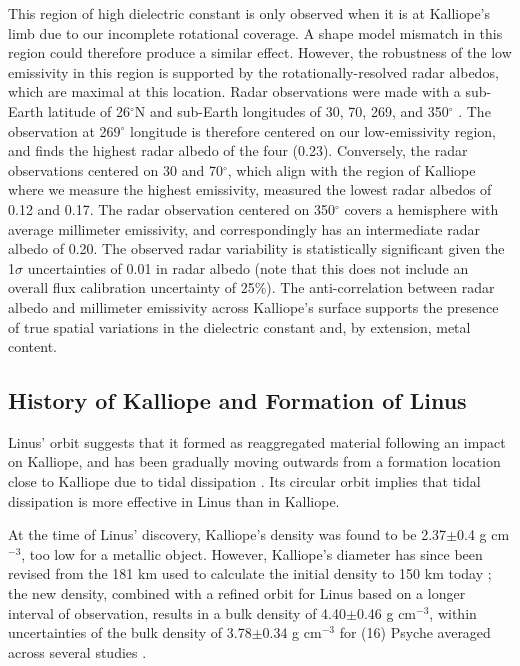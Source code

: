 \documentclass[]{aastex631}
\begin{document}
This region of high dielectric constant is only observed when it is at Kalliope's limb due to our incomplete rotational coverage. A shape model mismatch in this region could therefore produce a similar effect. However, the robustness of the low emissivity in this region is supported by the rotationally-resolved radar albedos, which are maximal at this location. Radar observations were made with a sub-Earth latitude of 26$^{\circ}$N and sub-Earth longitudes of 30, 70, 269, and 350$^{\circ}$ \citep[][and C. Magri, personal communication]{2007IcarMagri}. The observation at 269$^{\circ}$ longitude is therefore centered on our low-emissivity region, and finds the highest radar albedo of the four (0.23). Conversely, the radar observations centered on 30 and 70$^{\circ}$, which align with the region of Kalliope where we measure the highest emissivity, measured the lowest radar albedos of 0.12 and 0.17. The radar observation centered on 350$^{\circ}$ covers a hemisphere with average millimeter emissivity, and correspondingly has an intermediate radar albedo of 0.20. The observed radar variability is statistically significant given the 1$\sigma$ uncertainties of 0.01 in radar albedo (note that this does not include an overall flux calibration uncertainty of 25\%). The anti-correlation between radar albedo and millimeter emissivity across Kalliope's surface supports the presence of true spatial variations in the dielectric constant and, by extension, metal content.

\subsection{History of Kalliope and Formation of Linus}

Linus' orbit suggests that it formed as reaggregated material following an impact on Kalliope, and has been gradually moving outwards from a formation location close to Kalliope due to tidal dissipation \citep{margot2003}. Its circular orbit implies that tidal dissipation is more effective in Linus than in Kalliope. 

At the time of Linus' discovery, Kalliope's density was found to be 2.37$\pm$0.4 g cm$^{-3}$, too low for a metallic object. However, Kalliope's diameter has since been revised from the 181 km used to calculate the initial density to 150 km today \citep{ferrais2022}; the new density, combined with a refined orbit for Linus based on a longer interval of observation, results in a bulk density of 4.40$\pm$0.46 g cm$^{-3}$, within uncertainties of the bulk density of 3.78$\pm$0.34 g cm$^{-3}$ for (16) Psyche averaged across several studies \citep{2022SSRvElkinsTanton}.
\end{document}
